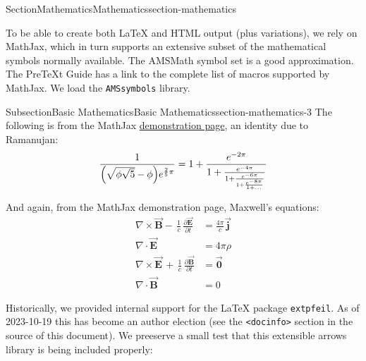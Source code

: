 \documentclass[twoside,10pt,]{article}
\newcommand{\mono}[1]{\texttt{#1}}
\numberwithin{equation}{section}
\begin{document}
%
%
\typeout{************************************************}
\typeout{************************************************}
%
\begin{sectionptx}{Section}{Mathematics}{}{Mathematics}{}{}{section-mathematics}
\begin{introduction}{}%
To be able to create both \LaTeX{} and HTML output (plus variations), we rely on MathJax, which in turn supports an extensive subset of the mathematical symbols normally available.  The AMSMath symbol set is a good approximation.  The PreTeXt Guide has a link to the complete list of macros supported by MathJax.  We load the \mono{AMSsymbols} library.%
\end{introduction}%
%
%
\typeout{************************************************}
\typeout{************************************************}
%
\begin{subsectionptx}{Subsection}{Basic Mathematics}{}{Basic Mathematics}{}{}{section-mathematics-3}
The following is from the MathJax \href{http://www.mathjax.org/demos/tex-samples/}{demonstration page}, an identity due to Ramanujan:%
\begin{equation*}
\frac{1}{\Bigl(\sqrt{\phi \sqrt{5}}-\phi\Bigr) e^{\frac25 \pi}} = 1+\frac{e^{-2\pi}} {1+\frac{e^{-4\pi}} {1+\frac{e^{-6\pi}} {1+\frac{e^{-8\pi}} {1+\ldots} } } }
\end{equation*}
%
\par
And again, from the MathJax demonstration page, Maxwell's equations:%
\begin{align*}
\nabla \times \vec{\mathbf{B}} -\, \frac1c\, \frac{\partial\vec{\mathbf{E}}}{\partial t} & = \frac{4\pi}{c}\vec{\mathbf{j}}\\
\nabla \cdot \vec{\mathbf{E}} & = 4 \pi \rho\\
\nabla \times \vec{\mathbf{E}}\, +\, \frac1c\, \frac{\partial\vec{\mathbf{B}}}{\partial t} & = \vec{\mathbf{0}}\\
\nabla \cdot \vec{\mathbf{B}} & = 0
\end{align*}
\label{section-mathematics-3-3-3}%
\par
Historically, we provided internal support for the \LaTeX{} package \mono{extpfeil}.  As of 2023-10-19 this has become an author election (see the \mono{<docinfo>} section in the source of this document).  We preeserve a small test that this extensible arrows library is being included properly:%
\begin{equation*}

\end{equation*}
\end{subsectionptx}
\end{sectionptx}
\end{document}

